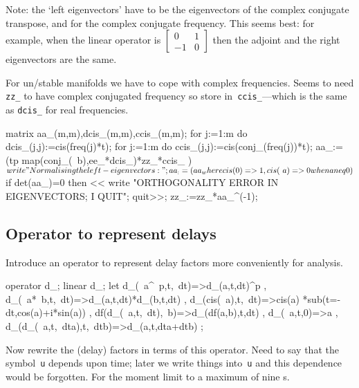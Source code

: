 \documentclass[11pt,a5paper]{article}
\begin{document}
Note: the `left eigenvectors' have to be the eigenvectors of the complex conjugate transpose, and for the complex conjugate frequency.
This seems best: for example, when the linear operator is \(\begin{bmatrix} 0&1\\-1&0 \end{bmatrix}\) then the adjoint and the right eigenvectors are the same.

For un/stable manifolds we have to cope with complex frequencies.  
Seems to need \verb|zz_| to have complex conjugated frequency so store in~\verb|ccis_|---which is the same as \verb|dcis_| for real frequencies.

\begin{reduce}
matrix aa_(m,m),dcis_(m,m),ccis_(m,m);
for j:=1:m do dcis_(j,j):=cis(freq(j)*t);
for j:=1:m do ccis_(j,j):=cis(conj_(freq(j))*t);
aa_:=(tp map(conj_(~b),ee_*dcis_)*zz_*ccis_ )$
write "Normalising the left-eigenvectors:";
aa_:=(aa_ where {cis(0)=>1, cis(~a)=>0 when a neq 0})$
if det(aa_)=0 then << write
    "ORTHOGONALITY ERROR IN EIGENVECTORS; I QUIT"; quit>>;
zz_:=zz_*aa_^(-1);
\end{reduce}


\subsection{Operator to represent delays}

Introduce an operator to represent delay factors more conveniently for analysis.

\begin{reduce}
operator d_; linear d_;
let { d_(~a^~p,t,~dt)=>d_(a,t,dt)^p
    , d_(~a*~b,t,~dt)=>d_(a,t,dt)*d_(b,t,dt)
    , d_(cis(~a),t,~dt)=>cis(a)
        *sub(t=-dt,cos(a)+i*sin(a))
    , df(d_(~a,t,~dt),~b)=>d_(df(a,b),t,dt)
    , d_(~a,t,0)=>a
    , d_(d_(~a,t,~dta),t,~dtb)=>d_(a,t,dta+dtb)
    };
\end{reduce}

Now rewrite the (delay) factors in terms of this operator.
Need to say that the symbol~\verb|u| depends upon time; later we write things into~\verb|u| and this dependence would be forgotten.
For the moment limit to a maximum of nine \ode{}s.

\end{document}
